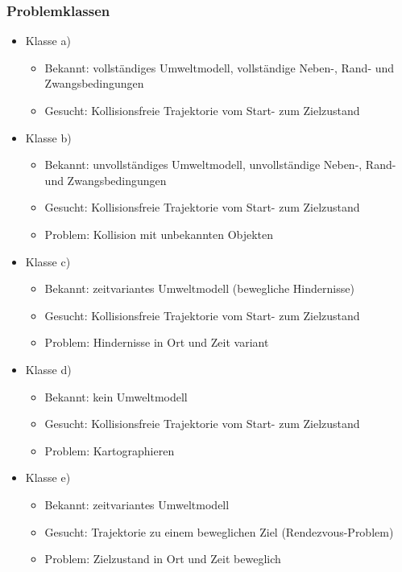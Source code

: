 \documentclass[paper=a4, fontsize=11pt]{scrartcl} %
\numberwithin{equation}{section} %
\numberwithin{figure}{section} %
\numberwithin{table}{section} %
\begin{document}
\subsubsection{Problemklassen}

\begin{itemize}
\item Klasse a)
\begin{itemize}
\item Bekannt: vollständiges Umweltmodell, vollständige Neben-, Rand- und Zwangsbedingungen
\item Gesucht: Kollisionsfreie Trajektorie vom Start- zum Zielzustand
\end{itemize}
\item Klasse b)
\begin{itemize}
\item Bekannt: unvollständiges Umweltmodell, unvollständige Neben-, Rand- und Zwangsbedingungen
\item Gesucht: Kollisionsfreie Trajektorie vom Start- zum Zielzustand
\item Problem: Kollision mit unbekannten Objekten
\end{itemize}
\item Klasse c)
\begin{itemize}
\item Bekannt: zeitvariantes Umweltmodell (bewegliche Hindernisse)
\item Gesucht: Kollisionsfreie Trajektorie vom Start- zum Zielzustand
\item Problem: Hindernisse in Ort und Zeit variant
\end{itemize}
\item Klasse d)
\begin{itemize}
\item Bekannt: kein Umweltmodell
\item Gesucht: Kollisionsfreie Trajektorie vom Start- zum Zielzustand
\item Problem: Kartographieren
\end{itemize}
\item Klasse e)
\begin{itemize}
\item Bekannt: zeitvariantes Umweltmodell
\item Gesucht: Trajektorie zu einem beweglichen Ziel (Rendezvous-Problem)
\item Problem: Zielzustand in Ort und Zeit beweglich
\end{itemize}
\end{itemize}
\end{document}
